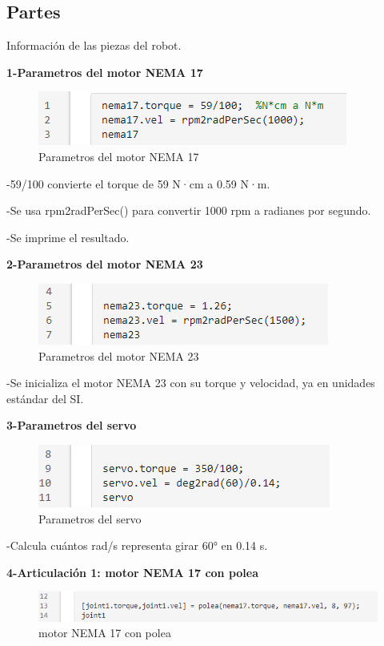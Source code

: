 \subsection{Partes} \label{subsec:partes}
Información de las piezas del robot. 

\textbf{1-Parametros del motor NEMA 17}
\begin{figure} [h]
	\centering
	\includegraphics[width=0.7\linewidth]{img/calculomotores1}
	\caption{Parametros del motor NEMA 17}
	\label{fig:calculomotores1}
\end{figure}


-59/100 convierte el torque de 59 N·cm a 0.59 N·m.

-Se usa rpm2radPerSec() para convertir 1000 rpm a radianes por segundo.

-Se imprime el resultado.


\textbf{2-Parametros del motor NEMA 23}
\begin{figure} [h]
	\centering
	\includegraphics[width=0.7\linewidth]{img/calculomotores2}
	\caption{Parametros del motor NEMA 23}
	\label{fig:calculomotores2}
\end{figure}


-Se inicializa el motor NEMA 23 con su torque y velocidad, ya en unidades estándar del SI.

\newpage
\textbf{3-Parametros del servo}
\begin{figure} [h]
	\centering
	\includegraphics[width=0.7\linewidth]{img/calculomotores3}
	\caption{Parametros del servo}
	\label{fig:calculomotores3}
\end{figure}

-Calcula cuántos rad/s representa girar 60° en 0.14 s.


\textbf{4-Articulación 1: motor NEMA 17 con polea}

\begin{figure} [h]
	\centering
	\includegraphics[width=0.7\linewidth]{img/calculomotores4}
	\caption{motor NEMA 17 con polea}
	\label{fig:calculomotores4}
\end{figure}

